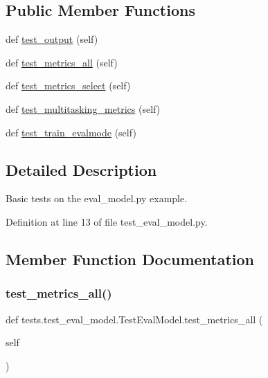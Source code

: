 \subsection*{Public Member Functions}
\begin{DoxyCompactItemize}
\item 
def \hyperlink{classtests_1_1test__eval__model_1_1TestEvalModel_a899d6a41fb8f56be62a7145d9937ee52}{test\+\_\+output} (self)
\item 
def \hyperlink{classtests_1_1test__eval__model_1_1TestEvalModel_a35d01001a5c2f289c98b384e1a53e515}{test\+\_\+metrics\+\_\+all} (self)
\item 
def \hyperlink{classtests_1_1test__eval__model_1_1TestEvalModel_a7b7b27f681704f217f711b04311977c2}{test\+\_\+metrics\+\_\+select} (self)
\item 
def \hyperlink{classtests_1_1test__eval__model_1_1TestEvalModel_a06987267bf1d5f021f3ddcbe489a820f}{test\+\_\+multitasking\+\_\+metrics} (self)
\item 
def \hyperlink{classtests_1_1test__eval__model_1_1TestEvalModel_a6f8c8d67ca1f6a036122e191fdc77c26}{test\+\_\+train\+\_\+evalmode} (self)
\end{DoxyCompactItemize}


\subsection{Detailed Description}
\begin{DoxyVerb}Basic tests on the eval_model.py example.
\end{DoxyVerb}
 

Definition at line 13 of file test\+\_\+eval\+\_\+model.\+py.



\subsection{Member Function Documentation}
\mbox{\label{classtests_1_1test__eval__model_1_1TestEvalModel_a35d01001a5c2f289c98b384e1a53e515}} 
\subsubsection{\texorpdfstring{test\+\_\+metrics\+\_\+all()}{test\_metrics\_all()}}
{\footnotesize\ttfamily def tests.\+test\+\_\+eval\+\_\+model.\+Test\+Eval\+Model.\+test\+\_\+metrics\+\_\+all (\begin{DoxyParamCaption}\item[{}]{self }\end{DoxyParamCaption})}

